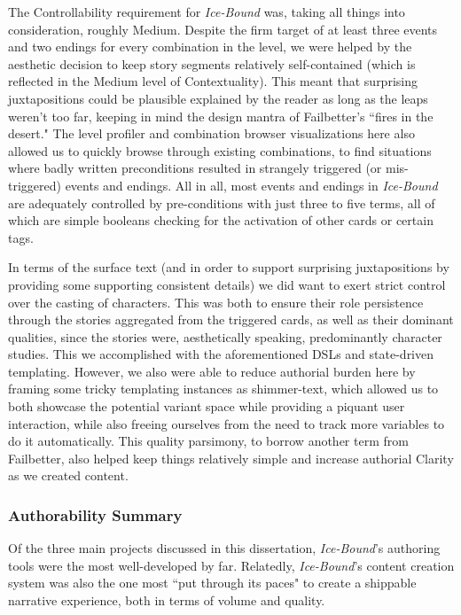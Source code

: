 The Controllability requirement for \textit{Ice-Bound} was, taking all things into consideration, roughly Medium. Despite the firm target of at least three events and two endings for every combination in the level, we were helped by the aesthetic decision to keep story segments relatively self-contained (which is reflected in the Medium level of Contextuality). This meant that surprising juxtapositions could be plausible explained by the reader as long as the leaps weren't too far, keeping in mind the design mantra of Failbetter's ``fires in the desert." The level profiler and combination browser visualizations here also allowed us to quickly browse through existing combinations, to find situations where badly written preconditions resulted in strangely triggered (or mis-triggered) events and endings. All in all, most events and endings in \textit{Ice-Bound} are adequately controlled by pre-conditions with just three to five terms, all of which are simple booleans checking for the activation of other cards or certain tags.

In terms of the surface text (and in order to support surprising juxtapositions by providing some supporting consistent details) we did want to exert strict control over the casting of characters. This was both to ensure their role persistence through the stories aggregated from the triggered cards, as well as their dominant qualities, since the stories were, aesthetically speaking, predominantly character studies. This we accomplished with the aforementioned DSLs and state-driven templating. However, we also were able to reduce authorial burden here by framing some tricky templating instances as shimmer-text, which allowed us to both showcase the potential variant space while providing a piquant user interaction, while also freeing ourselves from the need to track more variables to do it automatically. This quality parsimony, to borrow another term from Failbetter, also helped keep things relatively simple and increase authorial Clarity as we created content.

\subsubsection{Authorability Summary}\label{subsubsec:icebound-authorability-summary}

Of the three main projects discussed in this dissertation, \textit{Ice-Bound}'s authoring tools were the most well-developed by far. Relatedly, \textit{Ice-Bound}'s content creation system was also the one most ``put through its paces" to create a shippable narrative experience, both in terms of volume and quality.

